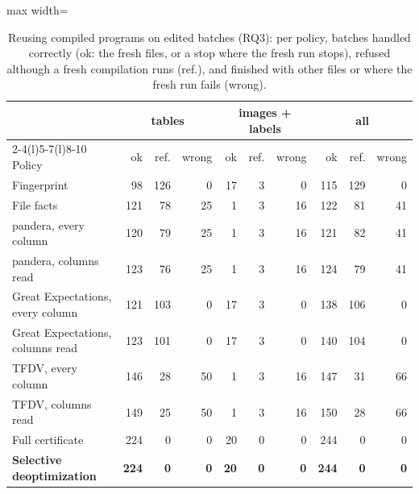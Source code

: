 \begin{table}[t]
\caption{Reusing compiled programs on edited batches (RQ3): per policy, batches handled correctly (ok: the fresh files, or a stop where the fresh run stops), refused although a fresh compilation runs (ref.), and finished with other files or where the fresh run fails (wrong).}
\label{tab:rq-edits}
\centering
\footnotesize
\begin{adjustbox}{max width=\linewidth}
\begin{tabular}{@{}lrrrrrrrrr@{}}
\toprule
& \multicolumn{3}{c}{tables} & \multicolumn{3}{c}{images + labels} & \multicolumn{3}{c}{all} \\
\cmidrule(l){2-4}\cmidrule(l){5-7}\cmidrule(l){8-10}
Policy & ok & ref. & wrong & ok & ref. & wrong & ok & ref. & wrong \\
\midrule
Fingerprint & 98 & 126 & 0 & 17 & 3 & 0 & 115 & 129 & 0 \\
File facts & 121 & 78 & 25 & 1 & 3 & 16 & 122 & 81 & 41 \\
pandera, every column & 120 & 79 & 25 & 1 & 3 & 16 & 121 & 82 & 41 \\
pandera, columns read & 123 & 76 & 25 & 1 & 3 & 16 & 124 & 79 & 41 \\
Great Expectations, every column & 121 & 103 & 0 & 17 & 3 & 0 & 138 & 106 & 0 \\
Great Expectations, columns read & 123 & 101 & 0 & 17 & 3 & 0 & 140 & 104 & 0 \\
TFDV, every column & 146 & 28 & 50 & 1 & 3 & 16 & 147 & 31 & 66 \\
TFDV, columns read & 149 & 25 & 50 & 1 & 3 & 16 & 150 & 28 & 66 \\
Full certificate & 224 & 0 & 0 & 20 & 0 & 0 & 244 & 0 & 0 \\
\textbf{Selective deoptimization} & \textbf{224} & \textbf{0} & \textbf{0} & \textbf{20} & \textbf{0} & \textbf{0} & \textbf{244} & \textbf{0} & \textbf{0} \\
\bottomrule
\end{tabular}
\end{adjustbox}
\end{table}
